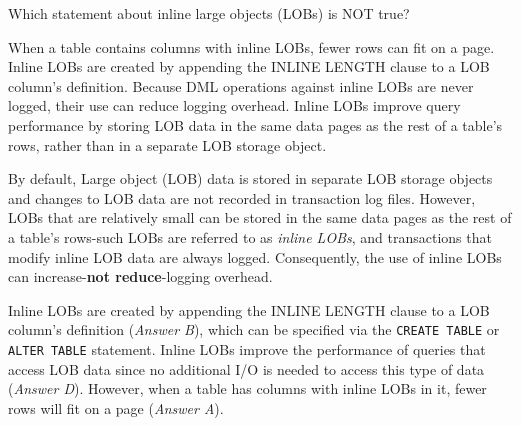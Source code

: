 \documentclass[answers, 11pt]{exam}
\begin{document}
\begin{questions}
\begin{solution}
\end{solution}

\question[1]
Which statement about inline large objects (LOBs) is NOT true?
\begin{choices} 
\choice When a table contains columns with inline LOBs, fewer rows can fit on a page.
\choice Inline LOBs are created by appending the INLINE LENGTH clause to a LOB column's definition.
\CorrectChoice Because DML operations against inline LOBs are never logged, their use can reduce logging overhead.
\choice Inline LOBs improve query performance by storing LOB data in the same data pages as the rest of a
table's rows, rather than in a separate LOB storage object.
\end{choices}

\begin{solution}
By default, Large object (LOB) data is stored in separate LOB storage objects and changes to LOB data
are not recorded in transaction log files. However, LOBs that are relatively small can be stored in the
same data pages as the rest of a table's rows-such LOBs are referred to as \textit{inline LOBs}, and
transactions that modify inline LOB data are always logged. Consequently, the use of inline LOBs can
increase-\textbf{not reduce}-logging overhead.
\par

Inline LOBs are created by appending the INLINE LENGTH clause to a LOB column's definition (\textit{Answer B}), which can be specified via the \texttt{CREATE TABLE} or \texttt{ALTER TABLE} statement. Inline LOBs
improve the performance of queries that access LOB data since no additional I/O is needed to access
this type of data (\textit{Answer D}). However, when a table has columns with inline LOBs in it,
fewer rows will fit on a page (\textit{Answer A}).

\end{solution}

\newpage
\addpoints
{}


\end{questions}
\end{document}

